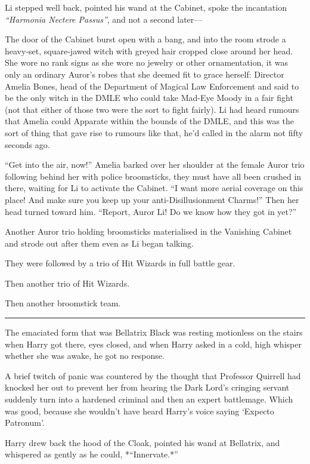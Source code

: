 Li stepped well back, pointed his wand at the Cabinet, spoke the
incantation \emph{``Harmonia Nectere Passus''}, and not a second
later---

The door of the Cabinet burst open with a bang, and into the room strode
a heavy-set, square-jawed witch with greyed hair cropped close around
her head. She wore no rank signs as she wore no jewelry or other
ornamentation, it was only an ordinary Auror's robes that she deemed fit
to grace herself: Director Amelia Bones, head of the Department of
Magical Law Enforcement and said to be the only witch in the DMLE who
could take Mad-Eye Moody in a fair fight (not that either of those two
were the sort to fight fairly). Li had heard rumours that Amelia could
Apparate within the bounds of the DMLE, and this was the sort of thing
that gave rise to rumours like that, he'd called in the alarm not fifty
seconds ago.

``Get into the air, now!'' Amelia barked over her shoulder at the female
Auror trio following behind her with police broomsticks, they must have
all been crushed in there, waiting for Li to activate the Cabinet. ``I
want more aerial coverage on this place! And make sure you keep up your
anti-Disillusionment Charms!'' Then her head turned toward him.
``Report, Auror Li! Do we know how they got in yet?''

Another Auror trio holding broomsticks materialised in the Vanishing
Cabinet and strode out after them even as Li began talking.

They were followed by a trio of Hit Wizards in full battle gear.

Then another trio of Hit Wizards.

Then another broomstick team.

\begin{center}\rule{3in}{0.4pt}\end{center}

The emaciated form that was Bellatrix Black was resting motionless on
the stairs when Harry got there, eyes closed, and when Harry asked in a
cold, high whisper whether she was awake, he got no response.

A brief twitch of panic was countered by the thought that Professor
Quirrell had knocked her out to prevent her from hearing the Dark Lord's
cringing servant suddenly turn into a hardened criminal and then an
expert battlemage. Which was good, because she wouldn't have heard
Harry's voice saying `Expecto Patronum'.

Harry drew back the hood of the Cloak, pointed his wand at Bellatrix,
and whispered as gently as he could, *``Innervate.*''

